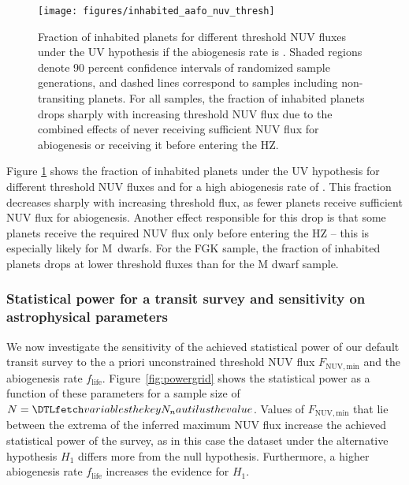 \documentclass[twocolumn,twocolappendix,linenumbers]{aastex631}
\begin{document}
\begin{figure}
    \begin{centering}
        \texttt{[image: figures/inhabited\_aafo\_nuv\_thresh]}
        \caption{Fraction of inhabited planets for different threshold \gls{NUV} fluxes under the UV hypothesis if the abiogenesis rate is . Shaded regions denote 90 percent confidence intervals of randomized sample generations, and dashed lines correspond to samples including non-transiting planets.
        For all samples, the fraction of inhabited planets drops sharply with increasing threshold \gls{NUV} flux due to the combined effects of never receiving sufficient \gls{NUV} flux for abiogenesis or receiving it before entering the \gls{HZ}.}
        \label{fig:inhabited_aafo_nuv_thresh}
    \end{centering}
\end{figure}
Figure \ref{fig:inhabited_aafo_nuv_thresh} shows the fraction of inhabited planets under the UV hypothesis for different threshold \gls{NUV} fluxes and for a high abiogenesis rate of .
This fraction decreases sharply with increasing threshold flux, as fewer planets receive sufficient \gls{NUV} flux for abiogenesis.
Another effect responsible for this drop is that some planets receive the required \gls{NUV} flux only before entering the \gls{HZ} -- this is especially likely for M~dwarfs.
For the FGK sample, the fraction of inhabited planets drops at lower threshold fluxes than for the M dwarf sample.


\subsubsection{Statistical power for a transit survey and sensitivity on astrophysical parameters}\label{sec:results-powergrid}
We now investigate the sensitivity of the achieved statistical power of our default transit survey to the a priori unconstrained threshold \gls{NUV} flux $F_\mathrm{NUV, min}$ and the abiogenesis rate $f_\mathrm{life}$.
Figure~\ref{fig:powergrid} shows the statistical power as a function of these parameters for a sample size of $N=\var{N_nautilus}$.
Values of $F_\mathrm{NUV, min}$ that lie between the extrema of the inferred maximum \gls{NUV} flux increase the achieved statistical power of the survey, as in this case the dataset under the alternative hypothesis $H_1$ differs more from the null hypothesis.
Furthermore, a higher abiogenesis rate $f_\mathrm{life}$ increases the evidence for $H_1$.
\end{document}
